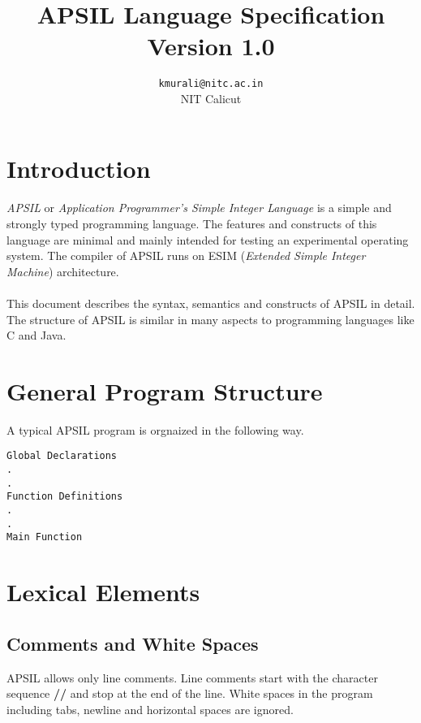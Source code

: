 \documentclass[11pt]{article}
\title{APSIL Language Specification\\
Version 1.0}
\author{\texttt{kmurali@nitc.ac.in} \\  \small {NIT Calicut} }
\begin{document}
 \newcommand{\kw}[1]{\texttt{#1}}
\maketitle
\tableofcontents
\pagebreak
\section{Introduction}
\paragraph{}
\textit{APSIL} or \textit{Application Programmer's Simple Integer Language} is a simple and strongly typed programming language. The features and constructs of this language are minimal and mainly intended for testing an experimental operating system. The compiler of APSIL runs on ESIM (\textit{Extended Simple Integer Machine}) architecture.
\paragraph{}
This document describes the syntax, semantics and constructs of APSIL in detail. The structure of APSIL is similar in many aspects to programming languages like C and Java. 

\section{General Program Structure}

A typical APSIL program is orgnaized in the following way. 

\begin{verbatim}
Global Declarations
. 
. 
Function Definitions
.
. 
Main Function
\end{verbatim}

\section{Lexical Elements}

\subsection{Comments and White Spaces}

APSIL allows only line comments. Line comments start with the character sequence \textbf{//} and stop at the end of the line. 
White spaces in the program including tabs, newline and horizontal spaces are ignored.
\end{document}
